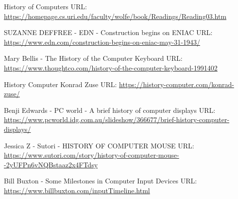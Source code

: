 \documentclass{article}
\begin{document}
 \newpage
 \begin{thebibliography}{00}
    
 History of Computers
\newline
URL: \url{https://homepage.cs.uri.edu/faculty/wolfe/book/Readings/Reading03.htm}

 SUZANNE DEFFREE - EDN - Construction begins on ENIAC
\newline
URL: \url{https://www.edn.com/construction-begins-on-eniac-may-31-1943/}

 Mary Bellis - The History of the Computer Keyboard
\newline
URL: \url{https://www.thoughtco.com/history-of-the-computer-keyboard-1991402}

 History Computer Konrad Zuse
\newline
URL: \url{https://history-computer.com/konrad-zuse/}

 Benji Edwards - PC world - A brief history of computer displays
\newline
URL: \url{https://www.pcworld.idg.com.au/slideshow/366677/brief-history-computer-displays/}

 Jessica Z - Sutori - HISTORY OF COMPUTER MOUSE
\newline
URL: \url{https://www.sutori.com/story/history-of-computer-mouse--2yUFPn6vNQBstaaz2x4FTdsy}

 Bill Buxton - Some Milestones in Computer Input Devices
\newline
URL: \url{https://www.billbuxton.com/inputTimeline.html}

\end{thebibliography}

\end{document}
